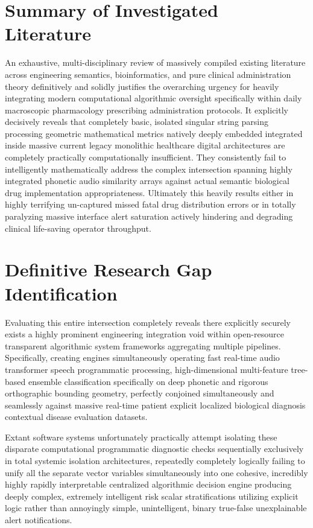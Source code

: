 \documentclass[12pt,a4paper]{report}
\begin{document}
\section{Summary of Investigated Literature}
An exhaustive, multi-disciplinary review of massively compiled existing literature across engineering semantics, bioinformatics, and pure clinical administration theory definitively and solidly justifies the overarching urgency for heavily integrating modern computational algorithmic oversight specifically within daily macroscopic pharmacology prescribing administration protocols. It explicitly decisively reveals that completely basic, isolated singular string parsing processing geometric mathematical metrics natively deeply embedded integrated inside massive current legacy monolithic healthcare digital architectures are completely practically computationally insufficient. They consistently fail to intelligently mathematically address the complex intersection spanning highly integrated phonetic audio similarity arrays against actual semantic biological drug implementation appropriateness. Ultimately this heavily results either in highly terrifying un-captured missed fatal drug distribution errors or in totally paralyzing massive interface alert saturation actively hindering and degrading clinical life-saving operator throughput.

\section{Definitive Research Gap Identification}
Evaluating this entire intersection completely reveals there explicitly securely exists a highly prominent engineering integration void within open-resource transparent algorithmic system frameworks aggregating multiple pipelines. Specifically, creating engines simultaneously operating fast real-time audio transformer speech programmatic processing, high-dimensional multi-feature tree-based ensemble classification specifically on deep phonetic and rigorous orthographic bounding geometry, perfectly conjoined simultaneously and seamlessly against massive real-time patient explicit localized biological diagnosis contextual disease evaluation datasets.

Extant software systems unfortunately practically attempt isolating these disparate computational programmatic diagnostic checks sequentially exclusively in total systemic isolation architectures, repeatedly completely logically failing to unify all the separate vector variables simultaneously into one cohesive, incredibly highly rapidly interpretable centralized algorithmic decision engine producing deeply complex, extremely intelligent risk scalar stratifications utilizing explicit logic rather than annoyingly simple, unintelligent, binary true-false unexplainable alert notifications.
\end{document}

